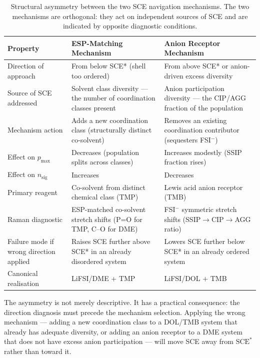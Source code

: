 \documentclass[11pt]{article}
\theoremstyle{plain}
\theoremstyle{definition}
\theoremstyle{remark}
\begin{document}
\begin{table}[h!]
\centering
\caption{Structural asymmetry between the two SCE navigation mechanisms.
The two mechanisms are orthogonal: they act on independent sources of
SCE and are indicated by opposite diagnostic conditions.}
\label{tab:asymmetry}
\small
\begin{tabular}{p{3.5cm}p{5cm}p{5cm}}
\toprule
Property & ESP-Matching Mechanism & Anion Receptor Mechanism \\
\midrule
Direction of approach & From below SCE* (shell too ordered) &
  From above SCE* or anion-driven excess diversity \\[6pt]
Source of SCE addressed & Solvent class diversity --- the number
  of coordination classes present & Anion participation diversity ---
  the CIP/AGG fraction of the population \\[6pt]
Mechanism action & Adds a new coordination class (structurally
  distinct co-solvent) & Removes an existing coordination
  contributor (sequesters FSI$^-$) \\[6pt]
Effect on $p_{\max}$ & Decreases (population splits across classes) &
  Increases modestly (SSIP fraction rises) \\[6pt]
Effect on $n_{\mathrm{sig}}$ & Increases & Decreases \\[6pt]
Primary reagent & Co-solvent from distinct chemical class (TMP) &
  Lewis acid anion receptor (TMB) \\[6pt]
Raman diagnostic & ESP-matched co-solvent stretch shifts
  (P=O for TMP, C--O for DME) & FSI$^-$ symmetric stretch shifts
  (SSIP$\to$CIP$\to$AGG ratio) \\[6pt]
Failure mode if wrong direction applied & Raises SCE further above
  SCE* in an already disordered system & Lowers SCE further below
  SCE* in an already ordered system \\[6pt]
Canonical realisation & LiFSI/DME + TMP & LiFSI/DOL + TMB \\
\bottomrule
\end{tabular}
\end{table}

The asymmetry is not merely descriptive.  It has a practical consequence:
the direction diagnosis must precede the mechanism selection.  Applying
the wrong mechanism --- adding a new coordination class to a DOL/TMB
system that already has adequate diversity, or adding an anion receptor
to a DME system that does not have excess anion participation --- will
move SCE away from $\mathrm{SCE}^{*}$ rather than toward it.
\end{document}
